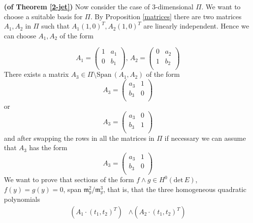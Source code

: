 \documentclass[10pt,a4paper]{amsart}
\renewenvironment{proof}[1]{\par\medskip\noindent\textbf{#1}\enspace\ignorespaces}{\par\medskip}
\begin{document}
\begin{proof}{(of Theorem \ref{2-jet})}
    Now consider the case of $3$-dimensional $\Pi$. We want to choose a suitable basis for $\Pi$.
    By Proposition \ref{matrices} there are two matrices $A_1, A_2$ in $\Pi$ such that $A_1 (1, 0)^T, A_2 (1, 0)^T$ are linearly independent. Hence we can choose $A_1, A_2$ of the form
    {\sloppy

    }
    \begin{equation*}
        A_1 =\begin{pmatrix}
            1&a_1\\
            0&b_1\\
        \end{pmatrix},\,
        A_2 =\begin{pmatrix}
            0&a_2\\
            1&b_2\\
        \end{pmatrix}
    \end{equation*}
    There exists a matrix $A_3 \in \Pi \setminus \mathrm{Span}\, (A_1, A_2)$ of the form
    \begin{equation*}
        A_3 =\begin{pmatrix}
            a_3&1\\
            b_3&0\\
        \end{pmatrix}
    \end{equation*}
    or
    \begin{equation*}
        A_3 =\begin{pmatrix}
            a_3&0\\
            b_3&1\\
        \end{pmatrix}
    \end{equation*}
    and after swapping the rows in all the matrices in $\Pi$ if necessary we can assume that $A_3$ has the form
    \begin{equation*}
        A_3 =\begin{pmatrix}
            a_3&1\\
            b_3&0\\
        \end{pmatrix}
    \end{equation*}
    We want to prove that sections of the form $f\wedge g \in H^0(\mathrm{det}\, E)$, $f(y) = g(y) = 0$, span $\mathfrak m_y^2/\mathfrak m_y^3$,
    that is, that the three homogeneous quadratic polynomials 
    \begin{align*}
    (A_1 \cdot (t_1, t_2)^T) &\wedge (A_2 \cdot (t_1, t_2)^T)\\

\end{align*}
\end{proof}
\end{document}
